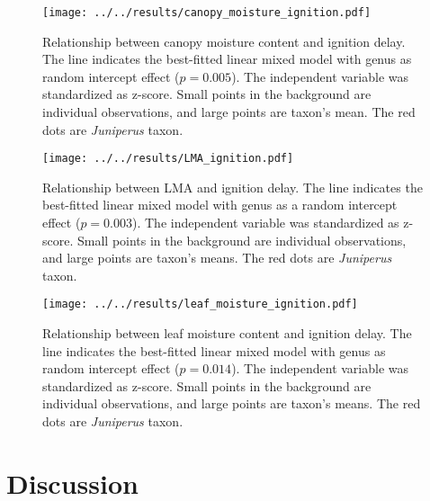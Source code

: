 \documentclass{ttuthes2007}
\begin{document}
\begin{figure}[ht]
    \centering
    \texttt{[image: ../../results/canopy\_moisture\_ignition.pdf]}
    \caption[Canopy moisture effect on ignition delay]{\label{fig:canopy_moisture_ig_delay}Relationship between canopy moisture content and ignition delay. The line indicates the best-fitted linear mixed model with genus as random intercept effect ($p = 0.005$). The independent variable was standardized  as z-score. Small points in the background are individual observations, and large points are taxon's mean. The red dots are \emph{Juniperus} taxon.}
    
\end{figure}

\begin{figure}[ht]
  \centering \texttt{[image: ../../results/LMA\_ignition.pdf]}
  \caption[LMA effect on ignition delay]{\label{fig:lma_ig_delay} Relationship between LMA and ignition delay. The line indicates the best-fitted linear mixed model with genus as a random intercept effect ($p = 0.003$). The independent variable was standardized  as z-score. Small points in the background are individual observations, and large points are taxon's means. The red dots are \emph{Juniperus} taxon.}
  
\end{figure}



\begin{figure}[ht]
  \centering \texttt{[image: ../../results/leaf\_moisture\_ignition.pdf]}
  \caption[Leaf moisture content effect on ignition delay]{\label{fig:leafmc_ig_delay}Relationship between leaf moisture content and ignition delay. The line indicates the best-fitted linear mixed model with genus as random intercept effect ($p = 0.014$). The independent variable was standardized  as z-score. Small points in the background are individual observations, and large points are taxon's means. The red dots are \emph{Juniperus} taxon.}
  
\end{figure}



\clearpage
\section{Discussion}
\end{document}
